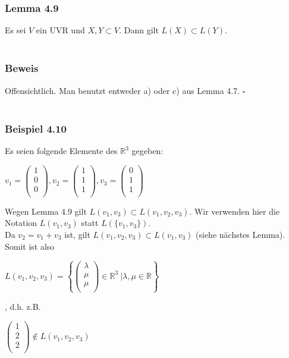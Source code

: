 \documentclass{article}
\begin{document}
\subsubsection*{Lemma 4.9}
Es sei $V$ ein UVR und $X, Y \subset V$. Dann gilt $L(X) \subset L(Y)$.\\
\\
\subsubsection*{Beweis}
Offensichtlich. Man benutzt entweder a) oder c) aus Lemma 4.7. $\square$ \\
\\
\subsubsection*{Beispiel 4.10}
Es seien folgende Elemente des $\mathbb{R}^3$ gegeben: \\
\begin{center}
    $v_1 = \begin{pmatrix}
        1 \\
        0 \\
        0 \\
    \end{pmatrix}, v_2 = \begin{pmatrix}
        1 \\
        1 \\
        1 \\
    \end{pmatrix}, v_3 = \begin{pmatrix}
        0 \\
        1 \\
        1 \\
    \end{pmatrix}$ \\
\end{center}
Wegen Lemma 4.9 gilt $L(v_1, v_3) \subset L(v_1, v_2, v_3)$. Wir verwenden hier die Notation $L(v_1, v_3)$ statt $L(\{v_1, v_3\})$. \\
Da $v_2 = v_1 + v_3$ ist, gilt $L(v_1, v_2, v_3) \subset L(v_1, v_3)$ (siehe nächstes Lemma). \\
Somit ist also \\
\begin{center}
    $L(v_1, v_2, v_3) = \left\{ \begin{pmatrix}
        \lambda \\
        \mu \\
        \mu \\
    \end{pmatrix} \in \mathbb{R}^3 \ | \lambda, \mu \in \mathbb{R}  \right\}$ \\
\end{center}
, d.h. z.B. \\
\begin{center}
    $\begin{pmatrix}
        1 \\
        2 \\
        2 \\
    \end{pmatrix} \notin L(v_1, v_2, v_3)$ \\  
\end{center}
\end{document}
